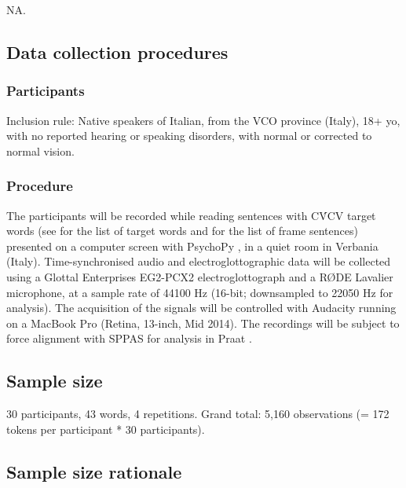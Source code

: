 \documentclass[11pt,]{article}
\begin{document}
NA.

\hypertarget{data-collection-procedures}{%
\subsection{Data collection
procedures}\label{data-collection-procedures}}

\hypertarget{participants}{%
\subsubsection{Participants}\label{participants}}

Inclusion rule: Native speakers of Italian, from the VCO province
(Italy), 18+ yo, with no reported hearing or speaking disorders, with
normal or corrected to normal vision.

\hypertarget{procedure}{%
\subsubsection{Procedure}\label{procedure}}

The participants will be recorded while reading sentences with CV́CV
target words (see  for the list of target words and
 for the list of frame sentences) presented on a
computer screen with PsychoPy \citep{peirce2009}, in a quiet room in
Verbania (Italy). Time-synchronised audio and electroglottographic data
will be collected using a Glottal Enterprises EG2-PCX2
electroglottograph and a RØDE Lavalier microphone, at a sample rate of
44100 Hz (16-bit; downsampled to 22050 Hz for analysis). The acquisition
of the signals will be controlled with Audacity running on a MacBook Pro
(Retina, 13-inch, Mid 2014). The recordings will be subject to force
alignment with SPPAS \citep{bigi2015} for analysis in Praat
\citep{boersma2018}.

\hypertarget{sample-size}{%
\subsection{Sample size}\label{sample-size}}

30 participants, 43 words, 4 repetitions. Grand total: 5,160
observations (= 172 tokens per participant * 30 participants).

\hypertarget{sample-size-rationale}{%
\subsection{Sample size rationale}\label{sample-size-rationale}}
\end{document}
